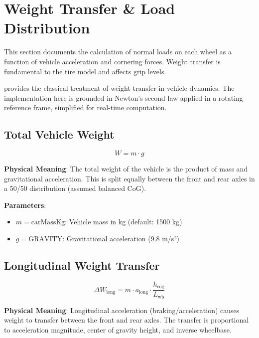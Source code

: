 \section{Weight Transfer \& Load Distribution}

This section documents the calculation of normal loads on each wheel as a function of vehicle acceleration and cornering forces. Weight transfer is fundamental to the tire model and affects grip levels.

\cite{milliken1995race} provides the classical treatment of weight transfer in vehicle dynamics. The implementation here is grounded in Newton's second law applied in a rotating reference frame, simplified for real-time computation.

\subsection{Total Vehicle Weight}

\begin{equation}
  W = m \cdot g
  \label{eq:total-weight}
\end{equation}

\textbf{Physical Meaning}: The total weight of the vehicle is the product of mass and gravitational acceleration. This is split equally between the front and rear axles in a 50/50 distribution (assumed balanced CoG).

\textbf{Parameters}:
\begin{itemize}
  \item $m = \mathrm{carMassKg}$: Vehicle mass in kg (default: 1500 kg)
  \item $g = \mathrm{GRAVITY}$: Gravitational acceleration (9.8 m/s²)
\end{itemize}

\subsection{Longitudinal Weight Transfer}

\begin{equation}
  \Delta W_{\text{long}} = m \cdot a_{\text{long}} \cdot \frac{h_{\text{cog}}}{L_{\text{wb}}}
  \label{eq:longitudinal-transfer}
\end{equation}

\textbf{Physical Meaning}: Longitudinal acceleration (braking/acceleration) causes weight to transfer between the front and rear axles. The transfer is proportional to acceleration magnitude, center of gravity height, and inverse wheelbase.

